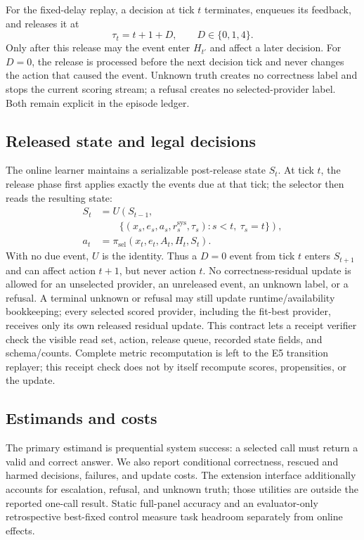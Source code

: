 \documentclass[sigconf,anonymous]{aamas}
\begin{document}
For the fixed-delay replay, a decision at tick $t$ terminates, enqueues its feedback, and releases it at
$$
\tau_t=t+1+D,\qquad D\in\{0,1,4\}.
$$
Only after this release may the event enter $H_{t'}$ and affect a later decision. For $D=0$, the release is processed before the next decision tick and never changes the action that caused the event. Unknown truth creates no correctness label and stops the current scoring stream; a refusal creates no selected-provider label. Both remain explicit in the episode ledger.

\subsection{Released state and legal decisions}
The online learner maintains a serializable post-release state $S_t$. At tick $t$, the release phase first applies exactly the events due at that tick; the selector then reads the resulting state:
$$
\begin{aligned}
S_t&=U\left(S_{t-1},\right.\\[-2pt]
&\qquad\left.\{(x_s,e_s,a_s,r_s^{\mathrm{sys}},\tau_s):s<t,\ \tau_s=t\}\right),\\
a_t&=\pi_{\mathrm{sel}}(x_t,e_t,A_t,H_t,S_t).
\end{aligned}
$$
With no due event, $U$ is the identity. Thus a $D=0$ event from tick $t$ enters $S_{t+1}$ and can affect action $t+1$, but never action $t$.
No correctness-residual update is allowed for an unselected provider, an unreleased event, an unknown label, or a refusal. A terminal unknown or refusal may still update runtime/availability bookkeeping; every selected scored provider, including the fit-best provider, receives only its own released residual update. This contract lets a receipt verifier check the visible read set, action, release queue, recorded state fields, and schema/counts. Complete metric recomputation is left to the E5 transition replayer; this receipt check does not by itself recompute scores, propensities, or the update.

\subsection{Estimands and costs}
The primary estimand is prequential system success: a selected call must return a valid and correct answer. We also report conditional correctness, rescued and harmed decisions, failures, and update costs. The extension interface additionally accounts for escalation, refusal, and unknown truth; those utilities are outside the reported one-call result. Static full-panel accuracy and an evaluator-only retrospective best-fixed control measure task headroom separately from online effects.
\end{document}
